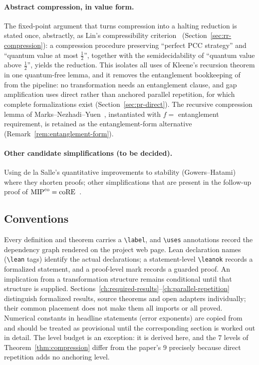 \paragraph{Abstract compression, in value form.}
The fixed-point argument that turns compression into a halting reduction is stated once,
abstractly, as Lin's compressibility criterion~\cite{Lin25}
(Section~\ref{sec:rr-compression}): a compression procedure preserving ``perfect PCC
strategy'' and ``quantum value at most $\frac12$'', together with the semidecidability of
``quantum value above $\frac12$'', yields the reduction. This isolates all uses of Kleene's recursion
theorem in one quantum-free lemma, and it removes the entanglement bookkeeping
of~\cite{JNVWY20} from the pipeline: no transformation needs an entanglement clause, and
gap amplification uses direct rather than anchored parallel repetition, for which complete
formalizations exist (Section~\ref{sec:pr-direct}). The recursive compression lemma of
Marks--Nezhadi--Yuen~\cite{MNY}, instantiated with $f = $ entanglement requirement, is
retained as the entanglement-form alternative (Remark~\ref{rem:entanglement-form}).

\paragraph{Other candidate simplifications (to be decided).}
Using de la Salle's quantitative improvements to stability (Gowers--Hatami) where they
shorten proofs; other simplifications that are present in the follow-up proof of
$\mathrm{MIP}^{\mathrm{co}}=\mathrm{coRE}$~\cite{Lin23,Lin25}.

\subsection{Conventions}
\label{sec:conventions}

Every definition and theorem carries a \verb|\label|, and \verb|\uses| annotations
record the dependency graph rendered on the project web page. Lean declaration names
(\verb|\lean| tags) identify the actual declarations; a statement-level \verb|\leanok|
records a formalized statement, and a proof-level mark records a guarded proof.
An implication from a transformation structure remains conditional until that structure
is supplied. Sections~\ref{ch:required-results}--\ref{ch:parallel-repetition} distinguish
formalized results, source theorems and open adapters individually; their common placement
does not make them all imports or all proved. Numerical constants in headline statements (error exponents)
are copied from~\cite{JNVWY20} and should be treated as provisional until the corresponding
section is worked out in detail. The level budget is an exception: it is derived here, and
the $7$ levels of Theorem~\ref{thm:compression} differ from the paper's $9$ precisely
because direct repetition adds no anchoring level.
